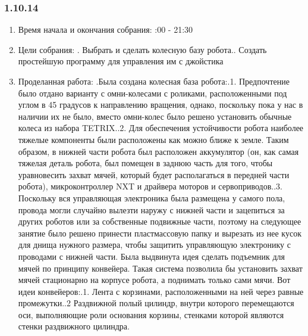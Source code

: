 \documentclass[12pt]{article}
\begin{document}
	      \subsubsection{1.10.14} 
	      \begin{enumerate}
	      	\item Время начала и окончания собрания:
	      	:00 - 21:30
	      	\item Цели собрания:
	      	.	Выбрать и сделать колесную базу робота..	Создать простейшую программу для управления им с джойстика\newline
	      	\item Проделанная работа:
	      	.Была создана колесная база робота:.1.	Предпочтение было отдано варианту с омни-колесами с роликами, расположенными под углом в 45 градусов к направлению вращения, однако, поскольку пока у нас в наличии их не было, вместо омни-колес было решено установить обычные колеса из набора TETRIX..2.	Для обеспечения устойчивости робота наиболее тяжелые компоненты были расположены как можно ближе к земле. Таким образом, в нижней части робота был расположен аккумулятор (он, как самая тяжелая деталь робота, был помещен в заднюю часть для того, чтобы уравновесить захват мячей, который будет располагаться в передней части робота), микроконтроллер NXT и драйвера моторов и сервоприводов..3.	Поскольку вся управляющая электроника была размещена у самого пола, провода могли случайно вылезти наружу с нижней части и зацепиться за других роботов или за собственные подвижные части, поэтому на следующее занятие было решено принести пластмассовую папку и вырезать из нее кусок для днища нужного размера, чтобы защитить управляющую электронику с проводами с нижней части.	Была выдвинута идея сделать подъемник для мячей по принципу конвейера. Такая система позволила бы установить захват мячей стационарно на корпусе робота, а поднимать только сами мячи. Вот идеи конвейеров:.1.	Лента с корзинами, расположенными на ней через равные промежутки..2	Раздвижной полый цилиндр, внутри которого перемещаются оси, выполняющие роли основания корзины, стенками которой являются стенки раздвижного цилиндра.\newline

\end{enumerate}
\end{document}
